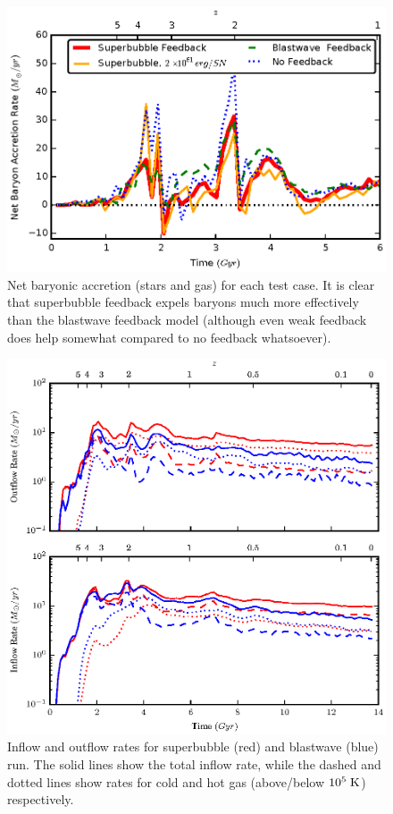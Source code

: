 \begin{figure}
    \includegraphics[width=\textwidth]{figures2/net_accretion.eps}
    \caption[Net baryonic accretion for different feedback models]{Net baryonic
    accretion (stars and gas) for each test case.  It is clear that superbubble
    feedback expels baryons much more effectively than the blastwave feedback
    model (although even weak feedback does help somewhat compared to no
    feedback whatsoever).}
    \label{net_accretion}
\end{figure}
\begin{figure}
    \includegraphics[width=\textwidth]{figures2/inflowoutflow.eps}
    \caption[Inflow and outflow rates for different feedback models]{Inflow and
    outflow rates for superbubble (red) and blastwave (blue) run.  The solid
    lines show the total inflow rate, while the dashed and dotted lines show
    rates for cold and hot gas (above/below $10^5\; \rm{K}$) respectively.  }
    \label{inflow_outflow}
\end{figure}
